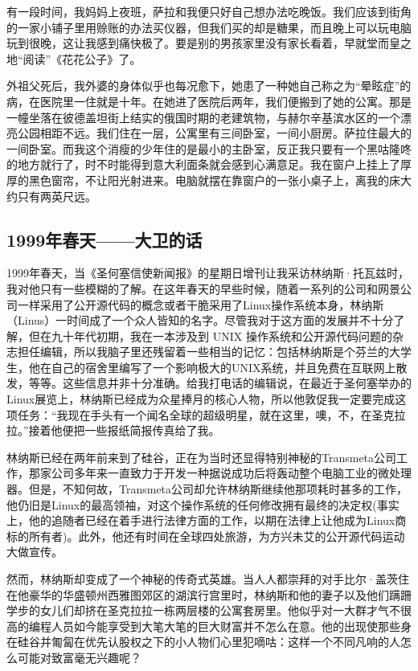 \documentclass[12pt,UTF8]{ctexbook}
\begin{document}
有一段时间，我妈妈上夜班，萨拉和我便只好自己想办法吃晚饭。我们应该到街角的一家小铺子里用赊账的办法买仪器，但我们买的却是糖果，而且晚上可以玩电脑玩到很晚，这让我感到痛快极了。要是别的男孩家里没有家长看着，早就堂而皇之地“阅读”《花花公子》了。

外祖父死后，我外婆的身体似乎也每况愈下，她患了一种她自己称之为“晕眩症”的病，在医院里一住就是十年。在她进了医院后两年，我们便搬到了她的公寓。那是一幢坐落在彼德盖坦街上结实的俄国时期的老建筑物，与赫尔辛基滨水区的一个漂亮公园相距不远。我们住在一层，公寓里有三间卧室，一间小厨房。萨拉住最大的一间卧室。而我这个消瘦的少年住的是最小的主卧室，反正我只要有一个黑咕隆咚的地方就行了，时不时能得到意大利面条就会感到心满意足。我在窗户上挂上了厚厚的黑色窗帘，不让阳光射进来。电脑就摆在靠窗户的一张小桌子上，离我的床大约只有两英尺远。

\subsection{1999年春天——大卫的话}

1999年春天，当《圣何塞信使新闻报》的星期日增刊让我采访林纳斯·托瓦兹时，我对他只有一些模糊的了解。在这年春天的早些时候，随着一系列的公司和网景公司一样采用了公开源代码的概念或者干脆采用了Linux操作系统本身，林纳斯（Linus）一时间成了一个众人皆知的名字。尽管我对于这方面的发展并不十分了解，但在九十年代初期，我在一本涉及到 UNIX 操作系统和公开源代码问题的杂志担任编辑，所以我脑子里还残留着一些相当的记忆：包括林纳斯是个芬兰的大学生，他在自己的宿舍里编写了一个影响极大的UNIX系统，并且免费在互联网上散发，等等。这些信息并非十分准确。给我打电话的编辑说，在最近于圣何塞举办的Linux展览上，林纳斯已经成为众星捧月的核心人物，所以他敦促我一定要完成这项任务：“我现在手头有一个闻名全球的超级明星，就在这里，噢，不，在圣克拉拉。”接着他便把一些报纸简报传真给了我。

林纳斯已经在两年前来到了硅谷，正在为当时还显得特别神秘的Transmeta公司工作，那家公司多年来一直致力于开发一种据说成功后将轰动整个电脑工业的微处理器。但是，不知何故，Transmeta公司却允许林纳斯继续他那项耗时甚多的工作，他仍旧是Linux的最高领袖，对这个操作系统的任何修改拥有最终的决定权(事实上，他的追随者已经在着手进行法律方面的工作，以期在法律上让他成为Linux商标的所有者)。此外，他还有时间在全球四处旅游，为方兴未艾的公开源代码运动大做宣传。

然而，林纳斯却变成了一个神秘的传奇式英雄。当人人都崇拜的对手比尔·盖茨住在他豪华的华盛顿州西雅图郊区的湖滨行宫里时，林纳斯和他的妻子以及他们蹒跚学步的女儿们却挤在圣克拉拉一栋两层楼的公寓套房里。他似乎对一大群才气不很高的编程人员如今能享受到大笔大笔的巨大财富并不怎么在意。他的出现使那些身在硅谷并匍匐在优先认股权之下的小人物们心里犯嘀咕：这样一个不同凡响的人怎么可能对致富毫无兴趣呢？
\end{document}
